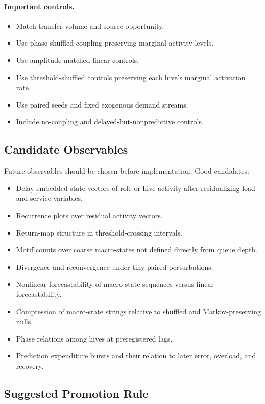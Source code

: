 \documentclass[11pt]{article}
\begin{document}
\paragraph{Important controls.}

\begin{itemize}
\item Match transfer volume and source opportunity.
\item Use phase-shuffled coupling preserving marginal activity levels.
\item Use amplitude-matched linear controls.
\item Use threshold-shuffled controls preserving each hive's marginal
activation rate.
\item Use paired seeds and fixed exogenous demand streams.
\item Include no-coupling and delayed-but-nonpredictive controls.
\end{itemize}

\subsection{Candidate Observables}

Future observables should be chosen before implementation. Good candidates:

\begin{itemize}
\item Delay-embedded state vectors of role or hive activity after residualizing
load and service variables.
\item Recurrence plots over residual activity vectors.
\item Return-map structure in threshold-crossing intervals.
\item Motif counts over coarse macro-states not defined directly from queue
depth.
\item Divergence and reconvergence under tiny paired perturbations.
\item Nonlinear forecastability of macro-state sequences versus linear
forecastability.
\item Compression of macro-state strings relative to shuffled and
Markov-preserving nulls.
\item Phase relations among hives at preregistered lags.
\item Prediction expenditure bursts and their relation to later error,
overload, and recovery.
\end{itemize}

\subsection{Suggested Promotion Rule}
\end{document}
